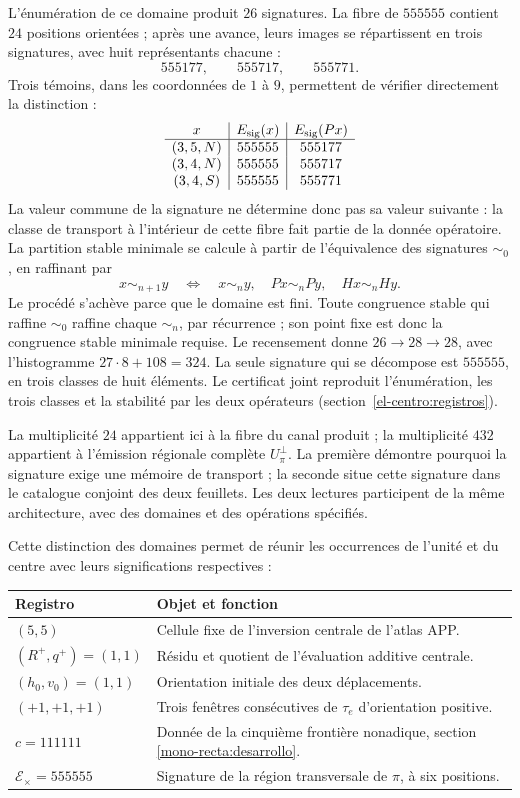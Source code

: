 L'énumération de ce domaine produit \(26\) signatures. La fibre de
\(555555\) contient \(24\) positions orientées ; après une
avance, leurs images se répartissent en trois signatures, avec huit
représentants chacune :
\[
 555177,\qquad555717,\qquad555771.
\]
Trois témoins, dans les coordonnées de \(1\) à \(9\), permettent de vérifier
directement la distinction :
\[
\begin{array}{c|c|c}
x&E_{\rm sig}(x)&E_{\rm sig}(Px)\\\hline
(3,5,N)&555555&555177\\
(3,4,N)&555555&555717\\
(3,4,S)&555555&555771
\end{array}
\]
La valeur commune de la signature ne détermine donc pas sa valeur suivante :
la classe de transport à l'intérieur de cette fibre fait partie de la donnée
opératoire. La partition stable minimale se calcule à partir de
l'équivalence des signatures \(\sim_0\), en raffinant par
\[
 x\sim_{n+1}y\quad\Longleftrightarrow\quad
 x\sim_n y,\quad Px\sim_n Py,\quad Hx\sim_n Hy.
\]
Le procédé s’achève parce que le domaine est fini. Toute congruence
stable qui raffine \(\sim_0\) raffine chaque \(\sim_n\), par récurrence ;
son point fixe est donc la congruence stable minimale requise.
Le recensement donne \(26\to28\to28\), avec l’histogramme
\(27\cdot8+108=324\). La seule signature qui se décompose est
\(555555\), en trois classes de huit éléments. Le certificat joint
reproduit l’énumération, les trois classes et la stabilité par les deux
opérateurs (section~\ref{el-centro:registros}).

La multiplicité \(24\) appartient ici à la fibre du canal produit ;
la multiplicité \(432\) appartient à l'émission régionale complète
\(U_\pi^\perp\). La première démontre pourquoi la signature exige une mémoire
de transport ; la seconde situe cette signature dans le catalogue conjoint
des deux feuillets. Les deux lectures participent de la même architecture,
avec des domaines et des opérations spécifiés.

Cette distinction des domaines permet de réunir les occurrences de l'unité
et du centre avec leurs significations respectives :
\begin{center}
\small
\begin{tabularx}{\textwidth}{@{}lX@{}}
\toprule
Registro & Objet et fonction \\
\midrule
\((5,5)\) & Cellule fixe de l'inversion centrale de l'atlas APP.\\
\((R^+,q^+)=(1,1)\) & Résidu et quotient de l'évaluation additive centrale.\\
\((h_0,v_0)=(1,1)\) & Orientation initiale des deux déplacements.\\
\((+1,+1,+1)\) & Trois fenêtres consécutives de \(\tau_e\) d'orientation positive.\\
\(c=111111\) & Donnée de la cinquième frontière nonadique, section \ref{mono-recta:desarrollo}.\\
\(\mathcal E_\times=555555\) & Signature de la région transversale de \(\pi\), à six positions.\\
\bottomrule
\end{tabularx}
\end{center}

